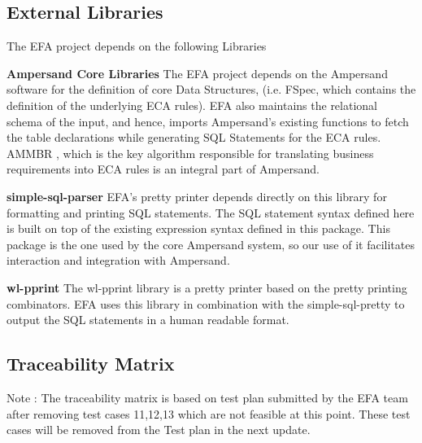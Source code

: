 \documentclass[12pt, svgnames]{article}
\let\Oldsubsection\subsection
\renewcommand{\subsection}{\FloatBarrier\Oldsubsection}
\begin{document}
        
\subsection{External Libraries}
The EFA project depends on the following Libraries 
\begin{description}
	\item \textbf{Ampersand Core Libraries} \newline
		The EFA project depends on the Ampersand software for the definition of 
		core Data Structures, (i.e. FSpec, which contains the definition of 
		the underlying ECA rules). EFA also maintains the relational schema of 
		the input, and hence, imports Ampersand's existing functions to fetch 
		the table declarations while generating SQL Statements for the ECA 
		rules. AMMBR \cite{AMMBR}, which is the key algorithm responsible for 
		translating business requirements into ECA rules is an integral part of 
		Ampersand.
	\item \textbf{simple-sql-parser} \newline
		EFA's pretty printer depends directly on this library for formatting 
		and printing SQL statements. The SQL statement syntax 
                defined here is built on top of the existing expression syntax defined 
                in this package. This package is the one used by the core Ampersand system,
                so our use of it facilitates interaction and integration with Ampersand. \cite{simple-sql}
	\item \textbf{wl-pprint} \newline 
          The wl-pprint library\cite{wl-pprint} is a pretty printer based on the
          pretty printing combinators. EFA uses this library in combination with
          the simple-sql-pretty to output the SQL statements in a human readable
          format.
	\item 
\end{description}

\subsection{Traceability Matrix} \label{SecTM}

Note : The traceability matrix is based on test plan submitted by the EFA team after removing test cases 11,12,13 which are not feasible at this point. These test cases will be removed from the Test plan in the next update.
\end{document}
